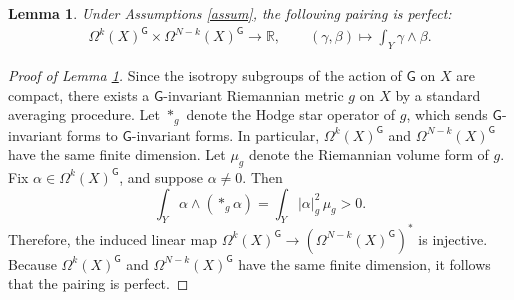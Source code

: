 \documentclass[11pt,reqno]{amsart}
\newcommand{\R}{\mathbb R}
\newcommand{\G}{\mathsf {G}}
\theoremstyle{plain}
\newtheorem{lemma}[theorem]{Lemma}
\theoremstyle{definition}
\theoremstyle{remark}
\begin{document}
\begin{lemma}
    \label{pairing lemma}
    Under Assumptions \ref{assum}, the following pairing is perfect:
    \begin{align}
        \label{pairing eq}
        \Omega^k(X)^\G \times \Omega^{N-k}(X)^\G \longrightarrow \R, \qquad (\gamma, \beta) \longmapsto \int_Y \gamma \wedge \beta.
    \end{align}
\end{lemma}
\begin{proof}[Proof of Lemma \ref{pairing lemma}]
    Since the isotropy subgroups of the action of $\G$ on $X$ are compact, there exists a $\G$-invariant Riemannian metric $g$ on $X$ by a standard averaging procedure. Let $*_g$ denote the Hodge star operator of $g$, which sends $\G$-invariant forms to $\G$-invariant forms. In particular, $\Omega^k(X)^\G$ and $\Omega^{N-k}(X)^\G$ have the same finite dimension. Let $\mu_g$ denote the Riemannian volume form of $g$. Fix $\alpha \in \Omega^k(X)^\G$, and suppose $\alpha \neq 0$. Then
    $$\int_Y \alpha \wedge (*_g \alpha)  = \int_Y |\alpha |_g^2 \, \mu_g >  0.$$
    Therefore, the induced linear map $\Omega^k(X)^\G  \rightarrow \left(\Omega^{N-k}(X)^\G \right)^*$ is injective. Because $\Omega^k(X)^\G$ and $\Omega^{N-k}(X)^\G$ have the same finite dimension, it follows that the pairing is perfect.
\end{proof}
\end{document}
